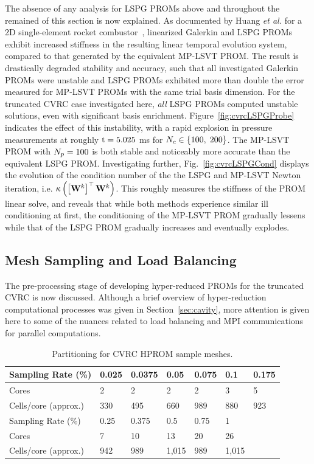 The absence of any analysis for LSPG PROMs above and throughout the remained of this section is now explained. As documented by Huang \textit{et al.} for a 2D single-element rocket combustor~\cite{Huang2022}, linearized Galerkin and LSPG PROMs exhibit increased stiffness in the resulting linear temporal evolution system, compared to that generated by the equivalent MP-LSVT PROM. The result is drastically degraded stability and accuracy, such that all investigated Galerkin PROMs were unstable and LSPG PROMs exhibited more than double the error measured for MP-LSVT PROMs with the same trial basis dimension. For the truncated CVRC case investigated here, \textit{all} LSPG PROMs computed unstable solutions, even with significant basis enrichment. Figure~\ref{fig:cvrcLSPGProbe} indicates the effect of this instability, with a rapid explosion in pressure measurements at roughly $\text{t} = 5.025$ ms for $N_c \in \{100, \; 200\}$. The MP-LSVT PROM with $N_p = 100$ is both stable and noticeably more accurate than the equivalent LSPG PROM. Investigating further, Fig.~\ref{fig:cvrcLSPGCond} displays the evolution of the condition number of the the LSPG and MP-LSVT Newton iteration, i.e. $\kappa \left(\left[\testBasis^{\newtonIdx}\right]^\top \testBasis^{\newtonIdx}\right)$. This roughly measures the stiffness of the PROM linear solve, and reveals that while both methods experience similar ill conditioning at first, the conditioning of the MP-LSVT PROM gradually lessens while that of the LSPG PROM gradually increases and eventually explodes.

\subsection{Mesh Sampling and Load Balancing}

The pre-processing stage of developing hyper-reduced PROMs for the truncated CVRC is now discussed. Although a brief overview of hyper-reduction computational processes was given in Section~\ref{sec:cavity}, more attention is given here to some of the nuances related to load balancing and MPI communications for parallel computations.

\begin{table}
	\centering
	\begin{tabular}{ lllllll }
	\toprule
	Sampling Rate (\%) & 0.025 & 0.0375 & 0.05 & 0.075 & 0.1 & 0.175 \\
	\midrule
	Cores & 2 & 2 & 2 & 2 & 3 & 5 \\
	Cells/core (approx.) & 330 & 495 & 660 & 989 & 880 & 923 \\
	\bottomrule
	\toprule
	Sampling Rate (\%) & 0.25 & 0.375 & 0.5 & 0.75 & 1 &  \\
	\midrule
	Cores & 7 & 10 & 13 & 20 & 26 & \\
	Cells/core (approx.) & 942 & 989 & 1,015 & 989 & 1,015 & \\
	\bottomrule
	\end{tabular}
	\caption{\label{tab:cvrcSampProcs}Partitioning for CVRC HPROM sample meshes.}
\end{table}

